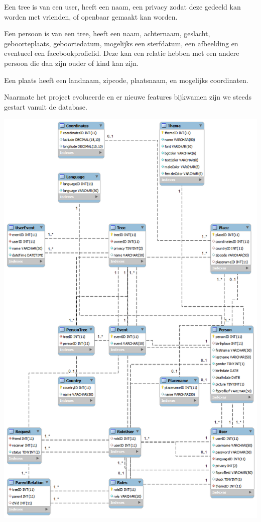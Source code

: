 \documentclass[pdftex,a4paper,12pt,twoside]{report}
\begin{document}
Een tree is van een user, heeft een naam, een privacy zodat deze gedeeld kan worden met vrienden, of openbaar gemaakt kan worden.

Een persoon is van een tree, heeft een naam, achternaam, geslacht, geboorteplaats,  geboortedatum, mogelijks een sterfdatum, een afbeelding en eventueel een facebookprofielid.  Deze kan een relatie hebben met een andere persoon die dan zijn ouder of kind kan zijn.

Een plaats heeft een landnaam, zipcode, plaatsnaam, en mogelijks coordinaten.

Naarmate het project evolueerde en er nieuwe features bijkwamen zijn we steeds gestart vanuit de database.

\includegraphics[width=\textwidth]{images/db.png}\\
\end{document}
